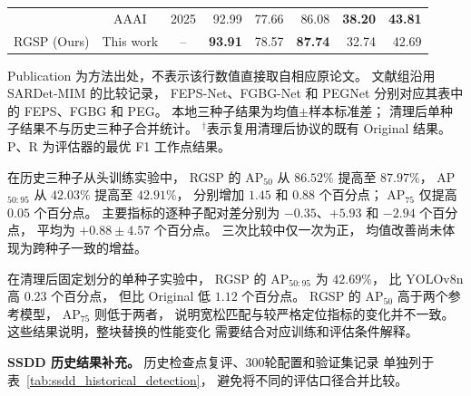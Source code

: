 \begin{table}[!t]
\begin{tabular*}{\textwidth}{@{\extracolsep{\fill}}lccrrrrr}
& AAAI & 2025
& 92.99 & 77.66 & 86.08 & \textbf{38.20} & \textbf{43.81} \\
RGSP (Ours)
& This work & --
& \textbf{93.91} & 78.57 & \textbf{87.74} & 32.74 & 42.69 \\
\bottomrule
\end{tabular*}
\smallskip
\begin{minipage}{\linewidth}
\footnotesize
Publication 为方法出处，不表示该行数值直接取自相应原论文。
文献组沿用 SARDet-MIM 的比较记录，
FEPS-Net、FGBG-Net 和 PEGNet
分别对应其表中的 FEPS、FGBG 和 PEG。
本地三种子结果为均值$\pm$样本标准差；
清理后单种子结果不与历史三种子合并统计。
$^{\dagger}$表示复用清理后协议的既有 Original 结果。
P、R 为评估器的最优 F1 工作点结果。
\end{minipage}
\end{table}

在历史三种子从头训练实验中，
RGSP 的 AP$_{50}$ 从 $86.52\%$ 提高至 $87.97\%$，
AP$_{50:95}$ 从 $42.03\%$ 提高至 $42.91\%$，
分别增加 $1.45$ 和 $0.88$ 个百分点；
AP$_{75}$ 仅提高 $0.05$ 个百分点。
主要指标的逐种子配对差分别为
$-0.35$、$+5.93$ 和 $-2.94$ 个百分点，
平均为 $+0.88\pm4.57$ 个百分点。
三次比较中仅一次为正，
均值改善尚未体现为跨种子一致的增益。

在清理后固定划分的单种子实验中，
RGSP 的 AP$_{50:95}$ 为 $42.69\%$，
比 YOLOv8n 高 $0.23$ 个百分点，
但比 Original 低 $1.12$ 个百分点。
RGSP 的 AP$_{50}$ 高于两个参考模型，
AP$_{75}$ 则低于两者，
说明宽松匹配与较严格定位指标的变化并不一致。
这些结果说明，整块替换的性能变化
需要结合对应训练和评估条件解释。

\textbf{SSDD 历史结果补充。}
历史检查点复评、300轮配置和验证集记录
单独列于表~\ref{tab:ssdd_historical_detection}，
避免将不同的评估口径合并比较。

